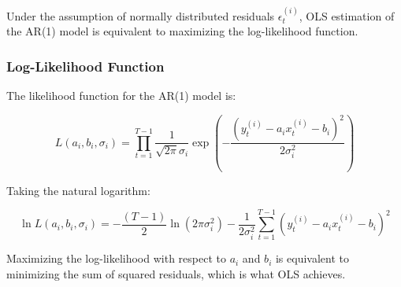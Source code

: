 \documentclass[12pt,article]{memoir}
\begin{document}
{Under the assumption of normally distributed residuals $\epsilon_t^{(i)}$, OLS estimation of the AR(1) model is equivalent to maximizing the log-likelihood function.

\subsubsection{Log-Likelihood Function}

The likelihood function for the AR(1) model is:

\begin{equation}
L(a_i, b_i, \sigma_i) = \prod_{t=1}^{T-1} \frac{1}{\sqrt{2\pi} \sigma_i} \exp\left( -\frac{ \left( y_t^{(i)} - a_i x_t^{(i)} - b_i \right)^2 }{2 \sigma_i^2} \right)
\end{equation}

Taking the natural logarithm:

\begin{equation}
\ln L(a_i, b_i, \sigma_i) = -\frac{(T - 1)}{2} \ln(2\pi \sigma_i^2) - \frac{1}{2 \sigma_i^2} \sum_{t=1}^{T-1} \left( y_t^{(i)} - a_i x_t^{(i)} - b_i \right)^2
\end{equation}

Maximizing the log-likelihood with respect to $a_i$ and $b_i$ is equivalent to minimizing the sum of squared residuals, which is what OLS achieves.
}
\end{document}

